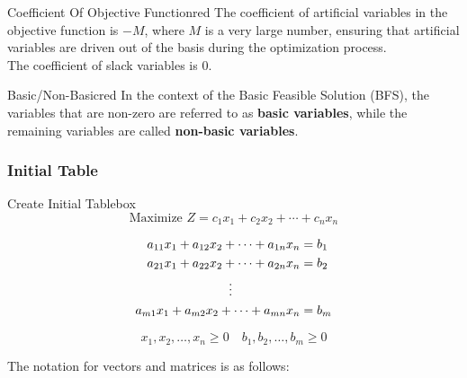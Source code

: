 \vspace{0.25cm}

\begin{prettyBox}{Coefficient Of Objective Function}{red}
The coefficient of artificial variables in the objective function is \(-M\),
where \(M\) is a very large number, ensuring that artificial variables are
driven out of the basis during the optimization process.\\[0.15cm]
The coefficient of slack variables is 0.
\end{prettyBox}

\vspace{0.25cm}
\begin{prettyBox}{Basic/Non-Basic}{red}
In the context of the Basic Feasible Solution (BFS), the variables that 
are non-zero are referred to as \textbf{basic variables}, while the remaining
variables are called \textbf{non-basic variables}.
\end{prettyBox}


\vspace{1cm}

\subsubsection{Initial Table}
\begin{prettyBox}{Create Initial Table}{box}
\[
    \text{Maximize } Z = c_1x_1 + c_2x_2 + \cdots + c_nx_n
\]

\vspace{0.25cm}
\hspace{1cm}
\[
\begin{aligned}
    a_{11}x_1 + a_{12}x_2 + \cdots + a_{1n}x_n &= b_1 \\
    a_{21}x_1 + a_{22}x_2 + \cdots + a_{2n}x_n &= b_2 \\
    &\hspace{-2cm}\vdots \\
    a_{m1}x_1 + a_{m2}x_2 + \cdots + a_{mn}x_n &= b_m
\end{aligned}
\]

\[
    x_1, x_2, \dots, x_n \geq 0 \quad b_1, b_2, \dots, b_m \geq 0 
\]
\end{prettyBox}

\newpage
The notation for vectors and matrices is as follows:

